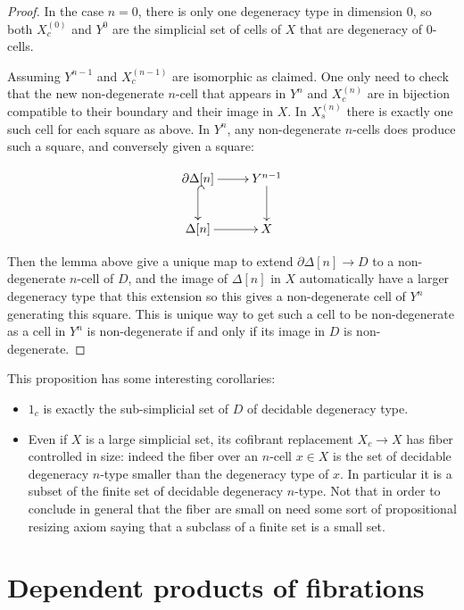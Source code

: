 \documentclass[reqno,10pt,a4paper,oneside,draft]{amsart}
\begin{document}
\begin{proof}
In the case $n=0$, there is only one degeneracy type in dimension $0$, so both $X^{(0)}_c$ and $Y^0$ are the simplicial set of cells of $X$ that are degeneracy of $0$-cells.

Assuming $Y^{n-1}$ and $X^{(n-1)}_c$ are isomorphic as claimed. One only need to check that the new non-degenerate $n$-cell that appears in $Y^{n}$ and $X^{(n)}_c$ are in bijection compatible to their boundary and their image in $X$.
In $X^{(n)}_s$ there is exactly one such cell for each square as above. In $Y^{n}$, any non-degenerate $n$-cells does produce such a square, and conversely given a square:

\[ \xymatrix{\partial \Delta[n]  \ar[r] \ar@{^{(}->}[d] & Y^{n-1} \ar[d] \\ \Delta[n]  \ar[r] & X} \]

Then the lemma above give a unique map to extend $\partial \Delta[n] \rightarrow D$ to a non-degenerate $n$-cell of $D$, and the image of $\Delta[n]$ in $X$ automatically have a larger degeneracy type that this extension so this gives a non-degenerate cell of $Y^{n}$ generating this square. This is unique way to get such a cell to be non-degenerate as a cell in $Y^n$ is non-degenerate if and only if its image in $D$ is non-degenerate.

\end{proof}


This proposition has some interesting corollaries:

\begin{itemize}

\item $1_c$ is exactly the sub-simplicial set of $D$ of decidable degeneracy type.

\item Even if $X$ is a large simplicial set, its cofibrant replacement $X_c \rightarrow X$ has fiber controlled in size: indeed the fiber over an $n$-cell $x \in X$ is the set of decidable degeneracy $n$-type smaller than the degeneracy type of $x$. In particular it is a subset of the finite set of decidable degeneracy $n$-type. Not that in order to conclude in general that the fiber are small on need some sort of propositional resizing axiom saying that a subclass of a finite set is a small set.

\end{itemize}

\newpage

\section{Dependent products of fibrations}
\end{document}
